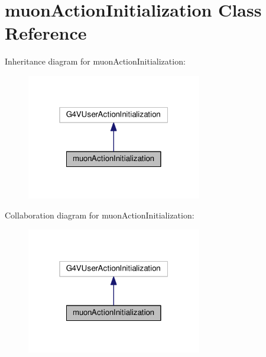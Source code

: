 \hypertarget{classmuonActionInitialization}{}\section{muon\+Action\+Initialization Class Reference}
\label{classmuonActionInitialization}


Inheritance diagram for muon\+Action\+Initialization\+:\nopagebreak
\begin{figure}[H]
\begin{center}
\leavevmode
\includegraphics[width=217pt]{classmuonActionInitialization__inherit__graph}
\end{center}
\end{figure}


Collaboration diagram for muon\+Action\+Initialization\+:\nopagebreak
\begin{figure}[H]
\begin{center}
\leavevmode
\includegraphics[width=217pt]{classmuonActionInitialization__coll__graph}
\end{center}
\end{figure}
